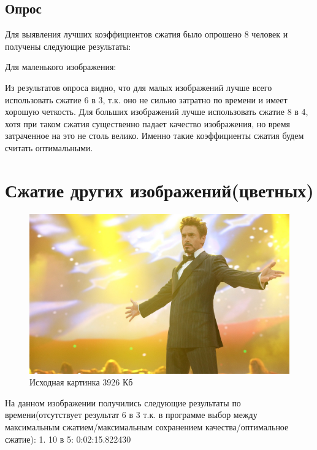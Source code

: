 \documentclass{article}
\begin{document}
\subsection{Опрос}

Для выявления лучших коэффициентов сжатия было опрошено 8 человек и получены следующие результаты:

Для маленького изображения:

\begin{figure}[h]
	\centering
	\hfill
\end{figure}

Из результатов опроса видно, что для малых изображений лучше всего использовать сжатие 6 в 3, т.к. оно не сильно затратно по времени и имеет хорошую четкость. Для больших изображений лучше использовать сжатие 8 в 4, хотя при таком сжатия существенно падает качество изображения, но время затраченное на это не столь велико. Именно такие коэффициенты сжатия будем считать оптимальными.

\section{Сжатие других изображений(цветных)}

\begin{figure}[h]
	\centering
	\includegraphics[width=0.4\linewidth]{input_3.jpg}
	\caption{Исходная картинка 3926 Кб}
	\label{fig:mpr}
\end{figure}

На данном изображении получились следующие результаты по времени(отсутствует результат 6 в 3 т.к. в программе выбор между максимальным сжатием/максимальным сохранением качества/оптимальное сжатие):
1. 10 в 5: 0:02:15.822430
\end{document}
